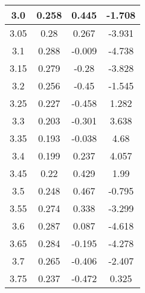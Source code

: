 \begin{multicols}{2}
\begin{longtable}{|c|c|c|c|}
    \hline
    3.0      & 0.258        & 0.445                                  & -1.708                                       \\
    \hline
    3.05     & 0.28         & 0.267                                  & -3.931                                       \\
    \hline
    3.1      & 0.288        & -0.009                                 & -4.738                                       \\
    \hline
    3.15     & 0.279        & -0.28                                  & -3.828                                       \\
    \hline
    3.2      & 0.256        & -0.45                                  & -1.545                                       \\
    \hline
    3.25     & 0.227        & -0.458                                 & 1.282                                        \\
    \hline
    3.3      & 0.203        & -0.301                                 & 3.638                                        \\
    \hline
    3.35     & 0.193        & -0.038                                 & 4.68                                         \\
    \hline
    3.4      & 0.199        & 0.237                                  & 4.057                                        \\
    \hline
    3.45     & 0.22         & 0.429                                  & 1.99                                         \\
    \hline
    3.5      & 0.248        & 0.467                                  & -0.795                                       \\
    \hline
    3.55     & 0.274        & 0.338                                  & -3.299                                       \\
    \hline
    3.6      & 0.287        & 0.087                                  & -4.618                                       \\
    \hline
    3.65     & 0.284        & -0.195                                 & -4.278                                       \\
    \hline
    3.7      & 0.265        & -0.406                                 & -2.407                                       \\
    \hline
    3.75     & 0.237        & -0.472                                 & 0.325                                        \\

\end{longtable}
\end{multicols}
